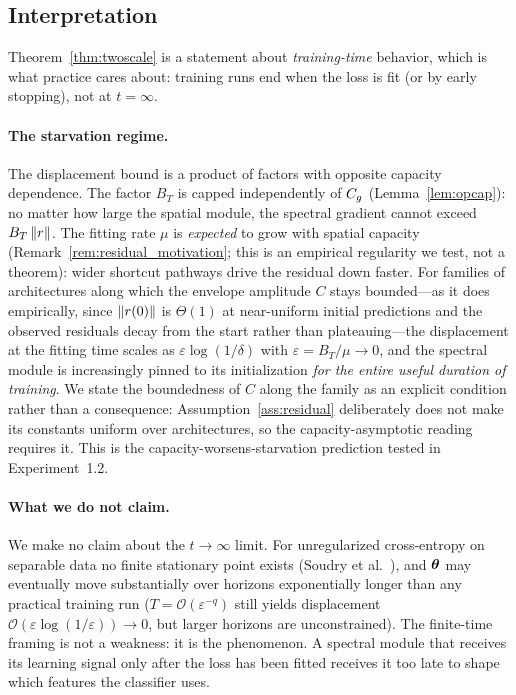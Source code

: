 \subsection{Interpretation}

Theorem~\ref{thm:twoscale} is a statement about \emph{training-time}
behavior, which is what practice cares about: training runs end when
the loss is fit (or by early stopping), not at $t = \infty$.

\paragraph{The starvation regime.}
The displacement bound is a product of factors with opposite
capacity dependence. The factor $B_T$ is capped independently of
$C_g$ (Lemma~\ref{lem:opcap}): no matter how large the spatial
module, the spectral gradient cannot exceed $B_T \left\lVert r\right\rVert$. The
fitting rate $\mu$ is \emph{expected} to grow with spatial capacity
(Remark~\ref{rem:residual_motivation}; this is an empirical
regularity we test, not a theorem): wider shortcut pathways drive
the residual down faster. For families of architectures along which
the envelope amplitude $C$ stays bounded---as it does empirically,
since $\left\lVert r(0)\right\rVert$ is $\Theta(1)$ at near-uniform initial
predictions and the observed residuals decay from the start rather
than plateauing---the displacement at the fitting time scales as
$\varepsilon \log(1/\delta)$ with $\varepsilon = B_T/\mu \to 0$, and
the spectral module is increasingly pinned to its initialization
\emph{for the entire useful duration of training}. We state the
boundedness of $C$ along the family as an explicit condition rather
than a consequence: Assumption~\ref{ass:residual} deliberately does
not make its constants uniform over architectures, so the
capacity-asymptotic reading requires it. This is the
capacity-worsens-starvation prediction tested in Experiment~1.2.

\paragraph{What we do not claim.}
We make no claim about the $t \to \infty$ limit. For unregularized
cross-entropy on separable data no finite stationary point exists
(Soudry et al.~\cite{soudry2018implicit}), and ${\boldsymbol{\theta}}$ may
eventually move substantially over horizons exponentially longer than
any practical training run ($T = \mathcal{O}(\varepsilon^{-q})$ still
yields displacement $\mathcal{O}(\varepsilon \log(1/\varepsilon)) \to
0$, but larger horizons are unconstrained). The finite-time framing is
not a weakness: it is the phenomenon. A spectral module that receives
its learning signal only after the loss has been fitted receives it
too late to shape which features the classifier uses.

